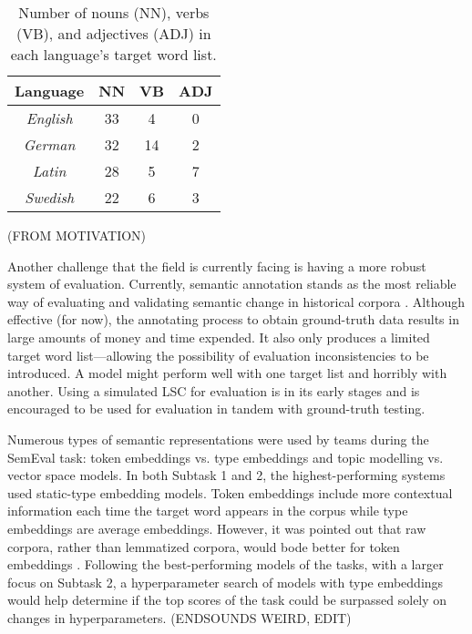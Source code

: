 \begin{table}[h]
\small
\centering
\begin{tabular}{|c|c|c|c|}
\hline
\textbf{Language} & \textbf{NN} & \textbf{VB} & \textbf{ADJ} \\ \hline
\textit{English}                          & 33          & 4           & 0            \\ \hline
\textit{German}                           & 32          & 14          & 2            \\ \hline
\textit{Latin}                            & 28          & 5           & 7            \\ \hline
\textit{Swedish}                          & 22          & 6           & 3            \\ \hline
\end{tabular}
\caption{Number of nouns (NN), verbs (VB), and adjectives (ADJ) in each language's target word list.}
\label{tab:postag-breakdown}
\end{table}

(FROM MOTIVATION)

Another challenge that the field is currently facing is having a more robust system of evaluation. Currently, semantic annotation stands as the most reliable way of evaluating and validating semantic change in historical corpora \citep{hengchen2021challenges}. Although effective (for now), the annotating process to obtain ground-truth data results in large amounts of money and time expended. It also only produces a limited target word list—allowing the possibility of evaluation inconsistencies to be introduced. A model might perform well with one target list and horribly with another. Using a simulated LSC for evaluation is in its early stages and is encouraged to be used for evaluation in tandem with ground-truth testing.

Numerous types of semantic representations were used by teams during the SemEval task: token embeddings vs. type embeddings and topic modelling vs. vector space models. In both Subtask 1 and 2, the highest-performing systems used static-type embedding models. Token embeddings include more contextual information each time the target word appears in the corpus while type embeddings are average embeddings. However, it was pointed out that raw corpora, rather than lemmatized corpora, would bode better for token embeddings \citep{schlechtweg-etal-2020-semeval}. Following the best-performing models of the tasks, with a larger focus on Subtask 2, a hyperparameter search of models with type embeddings would help determine if the top scores of the task could be surpassed solely on changes in hyperparameters. (ENDSOUNDS WEIRD, EDIT) 

